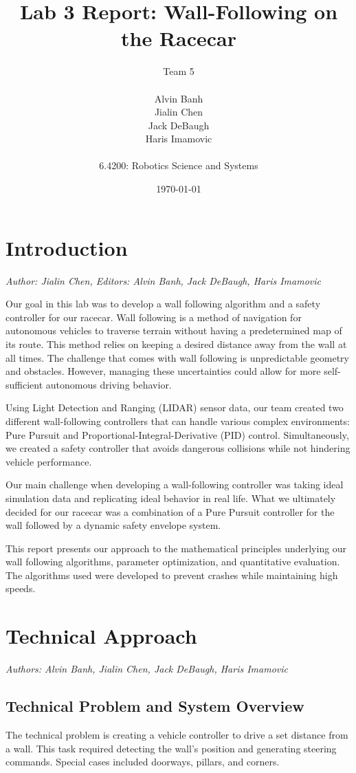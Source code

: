 \documentclass{article}
\title{Lab 3 Report: Wall-Following on the Racecar} %
\author{Team 5 \\\\ Alvin Banh \\ Jialin Chen \\ Jack DeBaugh \\ Haris Imamovic \\ \\ 6.4200: Robotics Science and Systems } %
\date{\today} %
\begin{document}
\maketitle

\section{Introduction}
\noindent\textit{Author: Jialin Chen, Editors: Alvin Banh, Jack DeBaugh, Haris Imamovic}

Our goal in this lab was to develop a wall following algorithm and a safety controller for our racecar. Wall following is a method of navigation for autonomous vehicles to traverse terrain without having a predetermined map of its route. This method relies on keeping a desired distance away from the wall at all times. The challenge that comes with wall following is unpredictable geometry and obstacles. However, managing these uncertainties could allow for more self-sufficient autonomous driving behavior.

Using Light Detection and Ranging (LIDAR) sensor data, our team created two different wall-following controllers that can handle various complex environments: Pure Pursuit and Proportional-Integral-Derivative (PID) control. Simultaneously, we created a safety controller that avoids dangerous collisions while not hindering vehicle performance.

Our main challenge when developing a wall-following controller was taking ideal simulation data and replicating ideal behavior in real life. What we ultimately decided for our racecar was a combination of a Pure Pursuit controller for the wall followed by a dynamic safety envelope system.

This report presents our approach to the mathematical principles underlying our wall following algorithms, parameter optimization, and quantitative evaluation. The algorithms used were developed to prevent crashes while maintaining high speeds.

\section{Technical Approach}
\noindent\textit{Authors: Alvin Banh, Jialin Chen, Jack DeBaugh, Haris Imamovic}

\subsection{Technical Problem and System Overview}
The technical problem is creating a vehicle controller to drive a set distance from a wall. This task required detecting the wall's position and generating steering commands. Special cases included doorways, pillars, and corners.
\end{document}

